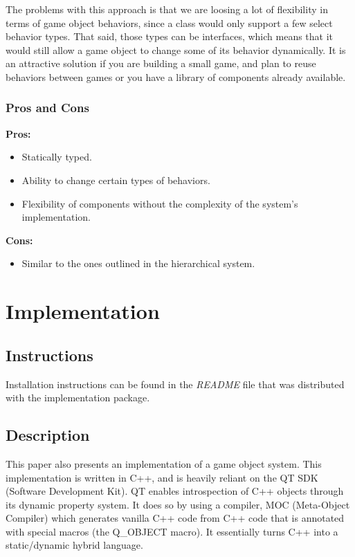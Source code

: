 \documentclass[
    phd,
    electronic,
    letterpaper,
    simplechapterheading,
    openany,
    parttop,
    lof,
]{byumsphd}
\begin{document}
The problems with this approach is that we are loosing a lot of flexibility in terms of game object behaviors, since a class would only support a few select behavior types. That said, those types can be interfaces, which means that it would still allow a game object to change some of its behavior dynamically. It is an attractive solution if you are building a small game, and plan to reuse behaviors between games or you have a library of components already available.

\subsection{Pros and Cons}

\begin{minipage}[t]{0.45\textwidth}
\textbf{Pros:}
\begin{itemize}
    \item Statically typed.
    \item Ability to change certain types of behaviors.
    \item Flexibility of components without the complexity of the system's implementation.
\end{itemize}\end{minipage}
\hfill \vrule \hfill
\begin{minipage}[t]{0.45\textwidth}
\textbf{Cons:}
\begin{itemize}
    \item Similar to the ones outlined in the hierarchical system.
\end{itemize}\end{minipage}


\chapter{Implementation}

\section{Instructions}

Installation instructions can be found in the \textit{README} file that was distributed with the implementation package.

\section{Description}

This paper also presents an implementation of a game object system. This implementation is written in C++, and is heavily reliant on the QT SDK (Software Development Kit). QT enables introspection of C++ objects through its dynamic property system. It does so by using a compiler, MOC (Meta-Object Compiler) which generates vanilla C++ code from C++ code that is annotated with special macros (the Q\_OBJECT macro). It essentially turns C++ into a static/dynamic hybrid language.
\end{document}
